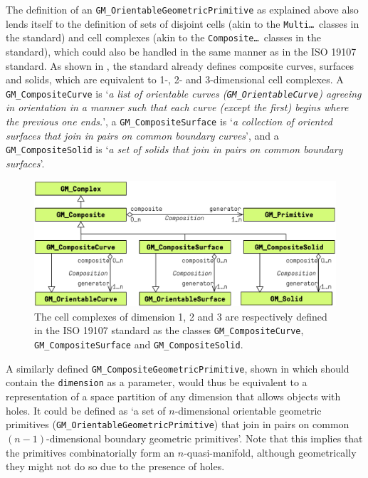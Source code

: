 The definition of an \texttt{GM\_OrientableGeometricPrimitive} as explained above also lends itself to the definition of sets of disjoint cells (akin to the \texttt{Multi\ldots}\ classes in the standard) and cell complexes (akin to the \texttt{Composite\ldots}\ classes in the standard), which could also be handled in the same manner as in the ISO 19107 standard.
As shown in , the standard already defines composite curves, surfaces and solids, which are equivalent to 1-, 2- and 3-dimensional cell complexes.
A \texttt{GM\_CompositeCurve} is `\emph{a list of orientable curves (\texttt{GM\_OrientableCurve}) agreeing in orientation in a manner such that each curve (except the first) begins where the previous one ends.}', a \texttt{GM\_CompositeSurface} is `\emph{a collection of oriented surfaces that join in pairs on common boundary curves}', and a \texttt{GM\_CompositeSolid} is `\emph{a set of solids that join in pairs on common boundary surfaces}'.

\begin{figure}
\centering
  \includegraphics[width=\linewidth]{figs/iso-composites}
  \caption[Cell complexes in the ISO 19107 standard]{The cell complexes of dimension 1, 2 and 3 are respectively defined in the ISO 19107 standard \citep[\S{}6.6.3]{ISO19107:2005} as the classes \texttt{GM\_CompositeCurve}, \texttt{GM\_CompositeSurface} and \texttt{GM\_CompositeSolid}.}
\label{fig:iso-composites}
\end{figure}

A similarly defined \texttt{GM\_CompositeGeometricPrimitive}, shown in  which should contain the \texttt{dimension} as a parameter, would thus be equivalent to a representation of a space partition of any dimension that allows objects with holes.
It could be defined as `a set of $n$-dimensional orientable geometric primitives (\texttt{GM\_OrientableGeometricPrimitive}) that join in pairs on common $(n-1)$-dimensional boundary geometric primitives'.
Note that this implies that the primitives combinatorially form an $n$-quasi-manifold, although geometrically they might not do so due to the presence of holes.

